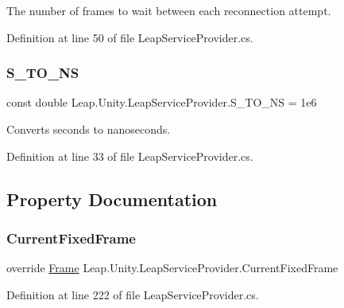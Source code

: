 The number of frames to wait between each reconnection attempt. 



Definition at line 50 of file Leap\+Service\+Provider.\+cs.

\mbox{\label{class_leap_1_1_unity_1_1_leap_service_provider_a0baaa02c5e7d4a148ec737876b7b388b}} 
\subsubsection{\texorpdfstring{S\_TO\_NS}{S\_TO\_NS}}
{\footnotesize\ttfamily const double Leap.\+Unity.\+Leap\+Service\+Provider.\+S\+\_\+\+T\+O\+\_\+\+NS = 1e6\hspace{0.3cm}{\ttfamily [protected]}}



Converts seconds to nanoseconds. 



Definition at line 33 of file Leap\+Service\+Provider.\+cs.



\subsection{Property Documentation}
\mbox{\label{class_leap_1_1_unity_1_1_leap_service_provider_a702f0ea7c9a82cdc65738b8545235d60}} 
\subsubsection{\texorpdfstring{CurrentFixedFrame}{CurrentFixedFrame}}
{\footnotesize\ttfamily override \mbox{\hyperlink{class_leap_1_1_frame}{Frame}} Leap.\+Unity.\+Leap\+Service\+Provider.\+Current\+Fixed\+Frame\hspace{0.3cm}{\ttfamily [get]}}



Definition at line 222 of file Leap\+Service\+Provider.\+cs.

